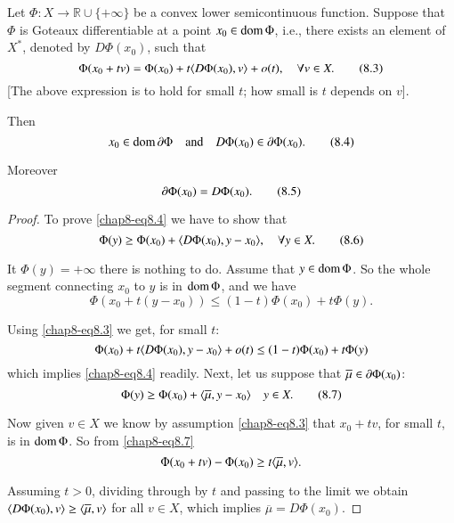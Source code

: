 \begin{proposition}\label{chap8-prop8.2}
Let $\Phi:X\to \mathbb{R}\cup\{+\infty\}$ be a convex lower
semicontinuous function. Suppose that $\Phi$ is Goteaux differentiable
at a point $x_{0}\in \operatorname{dom} \Phi$, i.e., there exists an element of
$X^{*}$, denoted by $D\Phi(x_{0})$, such that
\begin{equation*}
\Phi(x_{0}+tv)=\Phi(x_{0})+t\langle D\Phi(x_{0}),v\rangle+o(t),\quad \forall v\in
X.\tag{8.3}\label{chap8-eq8.3} 
\end{equation*}
[The above expression is to hold for small $t$; how small is $t$
  depends on $v$].

Then
\begin{equation*}
x_{0}\in \operatorname{dom} \partial \Phi\quad\text{and}\quad D\Phi(x_{0})\in \partial
\Phi(x_{0}).\tag{8.4}\label{chap8-eq8.4} 
\end{equation*}

Moreover
\begin{equation*}
\partial \Phi(x_{0})=D\Phi(x_{0}).\tag{8.5}\label{chap8-eq8.5}
\end{equation*}
\end{proposition}

\begin{proof}
To prove \eqref{chap8-eq8.4} we have to show that
\begin{equation*}
\Phi(y)\geq \Phi(x_{0})+\langle D\Phi(x_{0}),y-x_{0}\rangle,\quad \forall y\in
X.\tag{8.6}\label{chap8-eq8.6} 
\end{equation*}

It $\Phi(y)=+\infty$ there is nothing to do. Assume that $y\in
\operatorname{dom}\Phi$. So the whole segment connecting $x_{0}$ to $y$ is in $\operatorname{dom}
\Phi$, and we have
$$
\Phi(x_{0}+t(y-x_{0}))\leq (1-t)\Phi(x_{0})+t\Phi(y).
$$

Using \eqref{chap8-eq8.3} we get, for small $t$:
$$
\Phi(x_{0})+t\langle D\Phi(x_{0}),y-x_{0}\rangle +o(t)\leq
(1-t)\Phi(x_{0})+t\Phi(y) 
$$
which implies \eqref{chap8-eq8.4} readily. Next, let us suppose that
$\overline{\mu}\in \partial \Phi(x_{0})$:
\begin{equation*}
\Phi(y)\geq \Phi(x_{0})+\langle\overline{\mu},y-x_{0}\rangle\quad y\in
X.\tag{8.7}\label{chap8-eq8.7} 
\end{equation*}

Now given $v\in X$ we know by assumption \eqref{chap8-eq8.3} that
$x_{0}+tv$, for small $t$, is in $\operatorname{dom} \Phi$. So from
\eqref{chap8-eq8.7} 
$$
\Phi(x_{0}+tv)-\Phi(x_{0})\geq t\langle \overline{\mu},v\rangle.
$$

Assuming $t>0$, dividing through by $t$ and passing to the limit we
obtain $\langle D\Phi(x_{0}),v\rangle\geq \langle \overline{\mu},v\rangle$ for all
$v\in X$, which implies $\overline{\mu}=D\Phi(x_{0})$.
\end{proof}

